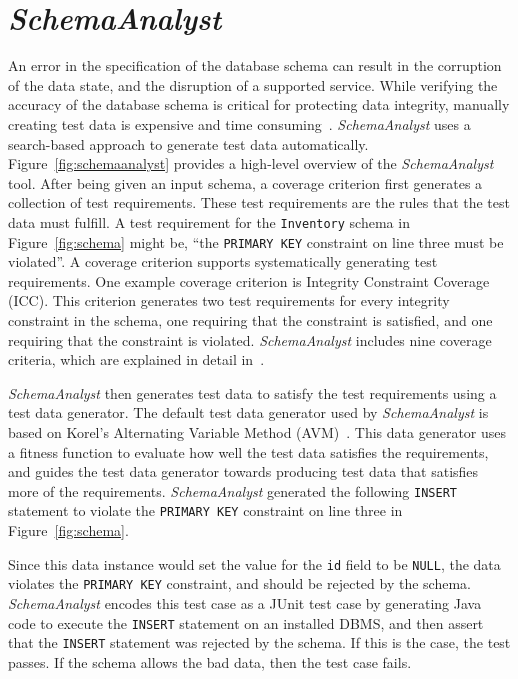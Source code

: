 \section{\textit{SchemaAnalyst}}\label{sec:technique}

An error in the specification of the database schema can result in the corruption of the
data state, and the disruption of a supported service.
While verifying the accuracy of the database schema is critical for protecting data integrity, manually
creating test data is expensive and time consuming~\cite{}. \textit{SchemaAnalyst} uses a search-based
approach to generate test data automatically. Figure~\ref{fig:schemaanalyst} provides a
high-level overview of the \textit{SchemaAnalyst} tool.
After being given an input schema, a coverage criterion first generates a collection of test 
requirements. These test requirements are the rules that
the test data must fulfill. A test requirement for the \texttt{Inventory} schema in
Figure~\ref{fig:schema} might be, ``the \texttt{PRIMARY KEY} constraint on line three must be
violated''. A coverage criterion supports systematically generating test requirements. One
example coverage criterion is Integrity Constraint Coverage (ICC). This criterion generates two test
requirements for every integrity constraint in the schema, one requiring that the constraint is
satisfied, and one requiring that the constraint is violated. \textit{SchemaAnalyst} includes nine
coverage criteria, which are explained in detail in~\cite{mcminn2015effectiveness}.

\textit{SchemaAnalyst} then generates test data
to satisfy the test requirements using a test data generator. The default test data generator used by
\textit{SchemaAnalyst} is based on Korel's Alternating Variable Method (AVM)~\cite{Korel:AVM}.
This data generator uses a fitness function to evaluate how well the test data satisfies the
requirements, and guides the test data generator towards producing test data that
satisfies more of the requirements. \textit{SchemaAnalyst} generated the following \texttt{INSERT}
statement to violate the \texttt{PRIMARY KEY} constraint on line three in Figure~\ref{fig:schema}.



Since this data instance would set the value for the \texttt{id} field to be \texttt{NULL},
the data violates the \texttt{PRIMARY KEY} constraint, and should be rejected by the schema.
\textit{SchemaAnalyst} encodes this test case as a JUnit test case by generating Java code to execute
the \texttt{INSERT} statement on an installed DBMS, and then assert that the \texttt{INSERT} statement
was rejected by the schema. If this is the case, the test passes.  If the schema allows the bad data,
then the test case fails.

